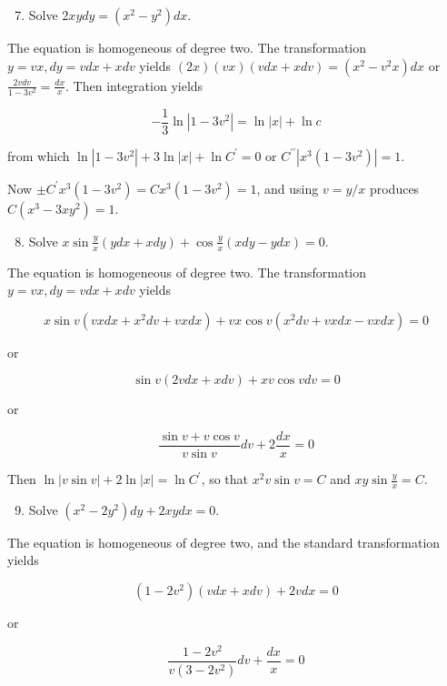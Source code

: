 \documentclass[10pt]{article}
\begin{document}
\begin{enumerate}
  \setcounter{enumi}{6}
  \item Solve $2 x y d y=\left(x^{2}-y^{2}\right) d x$.
\end{enumerate}

The equation is homogeneous of degree two. The transformation $y=v x, d y=v d x+x d v$ yields $(2 x)(v x)(v d x+x d v)=\left(x^{2}-v^{2} x\right) d x$ or $\frac{2 v d v}{1-3 v^{2}}=\frac{d x}{x}$. Then integration yields

$$
-\frac{1}{3} \ln \left|1-3 v^{2}\right|=\ln |x|+\ln c
$$

from which $\ln \left|1-3 v^{2}\right|+3 \ln |x|+\ln C^{\prime}=0$ or $C^{\prime \prime}\left|x^{3}\left(1-3 v^{2}\right)\right|=1$.

Now $\pm C^{\prime} x^{3}\left(1-3 v^{2}\right)=C x^{3}\left(1-3 v^{2}\right)=1$, and using $v=y / x$ produces $C\left(x^{3}-3 x y^{2}\right)=1$.

\begin{enumerate}
  \setcounter{enumi}{7}
  \item Solve $x \sin \frac{y}{x}(y d x+x d y)+\cos \frac{y}{x}(x d y-y d x)=0$.
\end{enumerate}

The equation is homogeneous of degree two. The transformation $y=v x, d y=v d x+x d v$ yields

$$
x \sin v\left(v x d x+x^{2} d v+v x d x\right)+v x \cos v\left(x^{2} d v+v x d x-v x d x\right)=0
$$

or

$$
\sin v(2 v d x+x d v)+x v \cos v d v=0
$$

or

$$
\frac{\sin v+v \cos v}{v \sin v} d v+2 \frac{d x}{x}=0
$$

Then $\ln |v \sin v|+2 \ln |x|=\ln C^{\prime}$, so that $x^{2} v \sin v=C$ and $x y \sin \frac{y}{x}=C$.

\begin{enumerate}
  \setcounter{enumi}{8}
  \item Solve $\left(x^{2}-2 y^{2}\right) d y+2 x y d x=0$.
\end{enumerate}

The equation is homogeneous of degree two, and the standard transformation yields

$$
\left(1-2 v^{2}\right)(v d x+x d v)+2 v d x=0
$$

or

$$
\frac{1-2 v^{2}}{v\left(3-2 v^{2}\right)} d v+\frac{d x}{x}=0
$$
\end{document}

